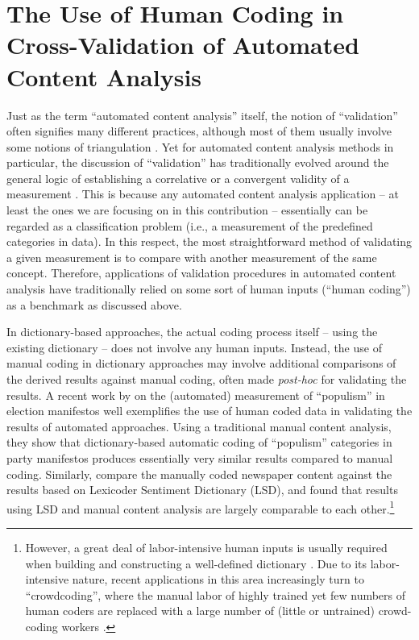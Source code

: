\documentclass[man, 12pt, a4paper, nolmodern, noextraspace]{apa6}
\begin{document}
\section{The Use of Human Coding in Cross-Validation of Automated Content Analysis}
    
    Just as the term \enquote{automated content analysis} itself, the notion of \enquote{validation} often signifies many different practices, although most of them usually involve some notions of triangulation \parencites{Neunhoeffer2018}. Yet for automated content analysis methods in particular, the discussion of \enquote{validation} has traditionally evolved around the general logic of establishing a correlative or a convergent validity of a measurement \parencites[][]{Krippendorff2008validity}. This is because any automated content analysis application -- at least the ones we are focusing on in this contribution -- essentially can be regarded as a classification problem (i.e., a measurement of the predefined categories in data). In this respect, the most straightforward method of validating a given measurement is to compare with another measurement of the same concept. Therefore, applications of validation procedures in automated content analysis have traditionally relied on some sort of human inputs (“human coding”) as a benchmark as discussed above. 
    
    In dictionary-based approaches, the actual coding process itself -- using the existing dictionary -- does not involve any human inputs. Instead, the use of manual coding in dictionary approaches may involve additional comparisons of the derived results against manual coding, often made \textit{post-hoc} for validating the results. A recent work by \textcite{Rooduijn2011} on the (automated) measurement of \enquote{populism} in election manifestos well exemplifies the use of human coded data in validating the results of automated approaches. Using a traditional manual content analysis, they show that dictionary-based automatic coding of \enquote{populism} categories in party manifestos produces essentially very similar results compared to manual coding. Similarly, \textcite{YoungSoroka2012} compare the manually coded newspaper content against the results based on Lexicoder Sentiment Dictionary (LSD), and found that results using LSD and manual content analysis are largely comparable to each other.\footnote{ However, a great deal of labor-intensive human inputs is usually required when building and constructing a well-defined dictionary \parencite{YoungSoroka2012, muddiman2018re}. Due to its labor-intensive nature, recent applications in this area increasingly turn to \enquote{crowdcoding}, where the manual labor of highly trained yet few numbers of human coders are replaced with a large number of (little or untrained) crowd-coding workers \parencites[][]{haselmayer2017sentiment, lind2017content}.} 
    
\end{document}
